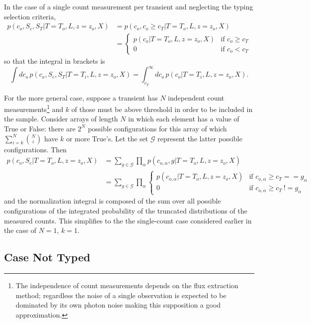 \documentclass[preprint,3p]{elsarticle}
\begin{document}
In the case of a single count measurement per transient and neglecting the typing selection criteria,
\begin{align}
 p(c_o, S_c, S_T | T=T_o, L, z=z_o, X) &=  p(c_o, c_o \ge  c_T | T=T_o, L, z=z_o, X) \\
 &= \begin{cases}
   p(c_o | T=T_o, L, z=z_o, X) & \text{if } c_o \ge c_T \\
   0 & \text{if }  c_o < c_T
 \end{cases}
\end{align}
so that the integral in brackets is
\begin{equation}
\int dc_o \, p(c_o,S_c, S_T | T=T_i, L, z=z_o, X) = \int_{c_T}^\infty dc_o\,  p(c_o | T=T_i, L, z=z_o, X).
\end{equation}

For the more general case, suppose a transient has $N$ independent count measurements\footnote{The independence of count measurements  depends on the flux extraction method; regardless the
noise of a single observation is expected to be dominated by its own photon noise making this
supposition a good approximation.} and $k$ of those must be above threshold in order to be
included in the sample.
Consider arrays of length $N$ in which each element has a value of True or False: there are $2^N$ possible configurations for this array
of which $\sum_{i=k}^N {N \choose i}$ have $k$ or more True's.  Let the set $\mathcal{G}$ represent the latter possible configurations.
Then
\begin{align}
p(c_o, S_c| T=T_o, L, z=z_o, X) &= \sum_{g \in \mathcal{G}} \prod_{\alpha} p(c_{o, \alpha}, g | T=T_o, L, z=z_o, X)\\
 &=  \sum_{g \in \mathcal{G}}  \prod_{\alpha} \begin{cases}
   p(c_{o,\alpha} | T=T_o, L, z=z_o, X) & \text{if } c_{o,\alpha} \ge c_T == g_\alpha \\
   0 & \text{if }  c_{o,\alpha} \ge c_T\  != g_\alpha
 \end{cases}
\end{align}
and the normalization integral is composed of the sum over all possible configurations of the integrated probability of the truncated distributions
of the measured counts.  This simplifies to the the single-count case considered earlier in the case of $N=1$, $k=1$.



\subsection{Case Not Typed}
\end{document}
